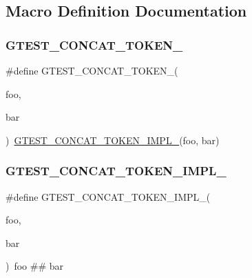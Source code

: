 \subsection{Macro Definition Documentation}
\mbox{\label{_obj__test_2lib_2googletest-master_2googletest_2include_2gtest_2internal_2gtest-internal_8h_ae3c336cbe1ae2bd1b1d019333e4428a0}} 
\subsubsection{\texorpdfstring{GTEST\_CONCAT\_TOKEN\_}{GTEST\_CONCAT\_TOKEN\_}}
{\footnotesize\ttfamily \#define G\+T\+E\+S\+T\+\_\+\+C\+O\+N\+C\+A\+T\+\_\+\+T\+O\+K\+E\+N\+\_\+(\begin{DoxyParamCaption}\item[{}]{foo,  }\item[{}]{bar }\end{DoxyParamCaption})~\mbox{\hyperlink{_obj__test_2lib_2googletest-release-1_88_81_2googletest_2include_2gtest_2internal_2gtest-internal_8h_aa39fb5346d3573feebe4257cb3a01fde}{G\+T\+E\+S\+T\+\_\+\+C\+O\+N\+C\+A\+T\+\_\+\+T\+O\+K\+E\+N\+\_\+\+I\+M\+P\+L\+\_\+}}(foo, bar)}

\mbox{\label{_obj__test_2lib_2googletest-master_2googletest_2include_2gtest_2internal_2gtest-internal_8h_aa39fb5346d3573feebe4257cb3a01fde}} 
\subsubsection{\texorpdfstring{GTEST\_CONCAT\_TOKEN\_IMPL\_}{GTEST\_CONCAT\_TOKEN\_IMPL\_}}
{\footnotesize\ttfamily \#define G\+T\+E\+S\+T\+\_\+\+C\+O\+N\+C\+A\+T\+\_\+\+T\+O\+K\+E\+N\+\_\+\+I\+M\+P\+L\+\_\+(\begin{DoxyParamCaption}\item[{}]{foo,  }\item[{}]{bar }\end{DoxyParamCaption})~foo \#\# bar}

